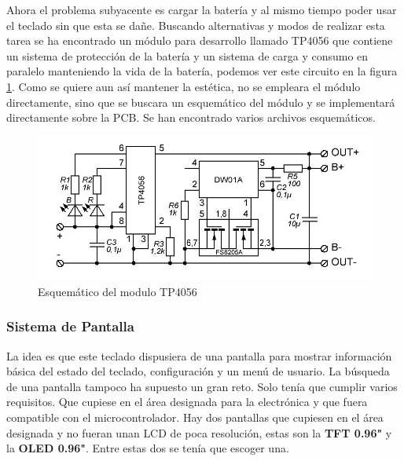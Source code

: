 Ahora el problema subyacente es cargar la batería y al mismo tiempo poder usar el teclado sin que esta se dañe. Buscando alternativas y modos de realizar esta tarea se ha encontrado un módulo para desarrollo llamado TP4056 que contiene un sistema de protección de la batería y un sistema de carga y consumo en paralelo manteniendo la vida de la batería, podemos ver este circuito en la figura \ref{fig:SchemeTP4056}. Como se quiere aun así mantener la estética, no se empleara el módulo directamente, sino que se buscara un esquemático del módulo y se implementará directamente sobre la \gls{PCB}. Se han encontrado varios archivos esquemáticos.

\begin{figure}[H]
    \centering
    \includegraphics[width=1\textwidth]{imagenes/Capitulos/Cap03/TP4056Schematic.png}
    \caption{Esquemático del modulo TP4056 \cite{TP4056SchematicInternet}}
    \label{fig:SchemeTP4056}
\end{figure}

\subsubsection{Sistema de Pantalla} \label{DiseñoPantalla}
La idea es que este teclado dispusiera de una pantalla para mostrar información básica del estado del teclado, configuración y un menú de usuario. La búsqueda de una pantalla tampoco ha supuesto un gran reto. Solo tenía que cumplir varios requisitos. Que cupiese en el área designada para la electrónica y que fuera compatible con el microcontrolador. Hay dos pantallas que cupiesen en el área designada y no fueran unan \gls{LCD} de poca resolución, estas son la \textbf{\gls{TFT} 0.96"} y la \textbf{\gls{OLED} 0.96"}. Entre estas dos se tenía que escoger una.

